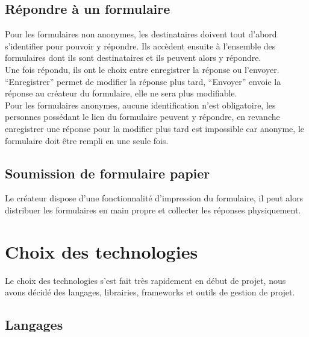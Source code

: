 \documentclass{sigplanconf}
\begin{document}
\subsection{Répondre à un formulaire}
Pour les formulaires non anonymes, les destinataires doivent tout d’abord s’identifier pour pouvoir y répondre. Ils accèdent ensuite à l’ensemble des formulaires dont ils sont destinataires et ils peuvent alors y répondre. \\
Une fois répondu, ils ont le choix entre enregistrer la réponse ou l'envoyer. “Enregistrer” permet de modifier la réponse plus tard, “Envoyer” envoie la réponse au créateur du formulaire, elle ne sera plus modifiable.\\
Pour les formulaires anonymes, aucune identification n’est obligatoire, les personnes possédant le lien du formulaire peuvent y répondre, en revanche enregistrer une réponse pour la modifier plus tard est impossible car anonyme, le formulaire doit être rempli en une seule fois.

\subsection{Soumission de formulaire papier}
Le créateur dispose d’une fonctionnalité d’impression du formulaire, il peut alors distribuer les formulaires en main propre et collecter les réponses physiquement. \\


\section{Choix des technologies}
Le choix des technologies s’est fait très rapidement en début de projet, nous avons décidé des langages, librairies, frameworks et outils de gestion de projet.
\subsection{Langages}
\end{document}
